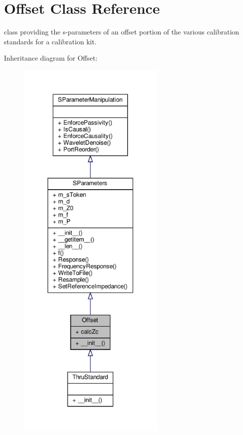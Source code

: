 \hypertarget{classSignalIntegrity_1_1Measurement_1_1CalKit_1_1Standards_1_1Offset_1_1Offset}{}\section{Offset Class Reference}
\label{classSignalIntegrity_1_1Measurement_1_1CalKit_1_1Standards_1_1Offset_1_1Offset}


class providing the s-\/parameters of an offset portion of the various calibration standards for a calibration kit.  




Inheritance diagram for Offset\+:
\nopagebreak
\begin{figure}[H]
\begin{center}
\leavevmode
\includegraphics[height=550pt]{classSignalIntegrity_1_1Measurement_1_1CalKit_1_1Standards_1_1Offset_1_1Offset__inherit__graph}
\end{center}
\end{figure}



